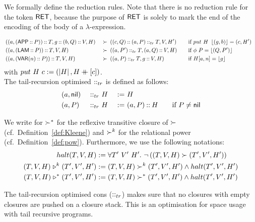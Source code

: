 We formally define the reduction rules.  Note that there is no reduction rule for the token $\mathsf{RET}$, because the purpose of $\mathsf{RET}$ is solely to
mark the end of the encoding of the body of a $\lambda$-expression.
\begin{definition}
  {\small
    \begin{alignat*}{4}
      & \left((a, (\mathsf{APP} \mathbin{::} P)) \mathbin{::} T, g \mathbin{::} (b, Q) \mathbin{::} V, H\right) &~\succ~& \left((c, Q) \mathbin{::} (a,P) \mathbin{::}_{tr} T, V, H'\right)
      \quad&& \text{if $put~H~\left\lfloor {(g,b)} \right\rfloor = (c,H')$} \\
      & \left((a, (\mathsf{LAM} \mathbin{::} P)) \mathbin{::} T, V, H\right)                      &~\succ~& \left((a, P') \mathbin{::}_{tr} T, (a,Q) \mathbin{::} V, H\right)
      \quad&& \text{if $\phi~P = \left\lfloor {(Q, P')} \right\rfloor$} & \\
      & \left((a, (\mathsf{VAR}(n) \mathbin{::} P)) \mathbin{::} T, V, H\right)                   &~\succ~& \left((a, P) \mathbin{::}_{tr} T, g \mathbin{::} V, H\right)
      \quad&& \text{if $H[a,n]=\left\lfloor {g} \right\rfloor$} &
    \end{alignat*}
  }
  with $put~H~c := (\left| H \right|, H \mathbin{+\mkern-10mu+} [c]) $.\\
  The tail-recursion optimised $\mathbin{::}_{tr}$ is defined as follows:
  \begin{alignat*}{3}
    & (a, \mathsf{nil}) &~\mathbin{::}_{tr}~& H &~:=~& H \\
    & (a, P   ) &~\mathbin{::}_{tr}~& H &~:=~& (a, P) \mathbin{::} H \qquad\text{if $P \neq \mathsf{nil}$}
  \end{alignat*}

  We write for $\succ^*$ for the reflexive transitive closure of $\succ$ (cf.\ Definition~\ref{def:Kleene}) and $\succ^k$ for the relational power (cf.\
  Definition~\ref{def:pow}).  Furthermore, we use the following notations:
  \begin{align*}
                         halt(T,V,H) &:= \forall T'~V'~H'.~\lnot \left((T,V,H) \succ (T',V',H')\right) \\
    (T,V,H) \mathrel{\triangleright}^k (T',V',H') &:= (T,V,H) \succ^k (T',V',H') \land halt(T',V',H') \\
    (T,V,H) \mathrel{\triangleright}^* (T',V',H') &:= (T,V,H) \succ^* (T',V',H') \land halt(T',V',H')
  \end{align*}
\end{definition}

The tail-recursion optimised cons ($\mathbin{::}_{tr}$) makes sure that no closures with empty closures are pushed on a closure stack.  This is an
optimisation for space usage with tail recursive programs.

